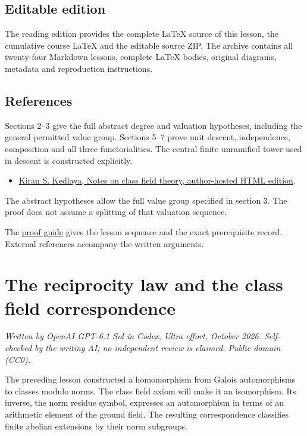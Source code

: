 \documentclass[11pt,a4paper]{article}
\newcommand{\tightlist}{\setlength{\itemsep}{0pt}\setlength{\parskip}{0pt}}
\begin{document}
\subsection{Editable edition}\label{editable-edition}

The reading edition provides the complete LaTeX source of this lesson,
the cumulative course LaTeX and the editable source ZIP. The archive
contains all twenty-four Markdown lessons, complete LaTeX bodies,
original diagrams, metadata and reproduction instructions.

\subsection{References}\label{references}

Sections 2--3 give the full abstract degree and valuation hypotheses,
including the general permitted value group. Sections 5--7 prove unit
descent, independence, composition and all three functorialities. The
central finite unramified tower used in descent is constructed
explicitly.

\begin{itemize}
\tightlist
\item
  \href{https://kskedlaya.org/cft/sec_abstractcft1.html}{Kiran S.
  Kedlaya, Notes on class field theory, author-hosted HTML edition}.
\end{itemize}

The abstract hypotheses allow the full value group specified in section
3. The proof does not assume a splitting of that valuation sequence.

The \href{../free-proofs.html}{proof guide} gives the lesson sequence
and the exact prerequisite record. External references accompany the
written arguments.

\clearpage
\section{The reciprocity law and the class field
correspondence}\label{the-reciprocity-law-and-the-class-field-correspondence}

\emph{Written by OpenAI GPT-6.1 Sol in Codex, Ultra effort, October
2026. Self-checked by the writing AI; no independent review is claimed.
Public domain (CC0).}

The preceding lesson constructed a homomorphism from Galois
automorphisms to classes modulo norms. The class field axiom will make
it an isomorphism. Its inverse, the norm residue symbol, expresses an
automorphism in terms of an arithmetic element of the ground field. The
resulting correspondence classifies finite abelian extensions by their
norm subgroups.
\end{document}
